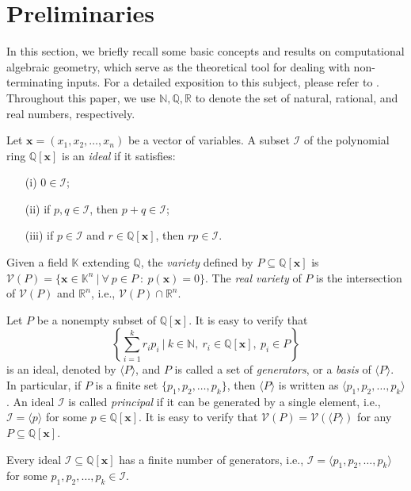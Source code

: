 \documentclass{jssc}
\newcommand{\I}{\mathcal{I}}
\newcommand{\V}{\mathcal{V}}
\newcommand{\xx}{\mathbf{x}}
\begin{document}
\section{Preliminaries}\label{sec:prel}
In this section, we briefly recall some basic concepts and results on computational algebraic geometry, which serve as the theoretical tool for dealing with non-terminating inputs. For a detailed exposition to this subject, please refer to \cite{cox:ideal}. Throughout this paper, we use $\mathbb{N}, \mathbb{Q}, \mathbb{R}$ to denote the set of natural, rational, and real numbers, respectively.

\begin{definition}[Ideal]
Let $\xx=(x_1,x_2,\ldots,x_n)$ be a vector of variables. A subset $\I$ of the polynomial ring $\mathbb{Q}[\xx]$ is an \emph{ideal} if it satisfies:
\begin{itemize}
\item[(i)] $0 \in \I$;
\item[(ii)] if $p,q \in \I$, then $p+q \in \I$;
\item[(iii)] if $p \in \I$ and $r \in \mathbb{Q}[\xx]$, then $rp \in \I$.
\end{itemize}
\end{definition}

\begin{definition}[Variety]
Given a field $\mathbb{K}$ extending $\mathbb{Q}$, the \emph{variety} defined by $P \subseteq \mathbb{Q}[\xx]$ is $\V(P)=\{\xx \in \mathbb{K}^n \ | \ \forall \ p \in P \ : \ p(\xx)=0 \}$. The \emph{real variety} of $P$ is the intersection of $\V(P)$ and $\mathbb{R}^n$, i.e., $\V(P) \cap \mathbb{R}^n$.
\end{definition}

Let $P$ be a nonempty subset of $\mathbb{Q}[\xx]$. It is easy to verify that
\[
\left\{\sum_{i=1}^k r_i p_i \ | \ k \in \mathbb{N}, \ r_i \in \mathbb{Q}[\xx],\ p_i \in P \right\}
\]
is an ideal, denoted by $\langle P\rangle$, and $P$ is called a set of \emph{generators}, or a \emph{basis} of $\langle P \rangle$. In particular, if $P$ is a finite set $\{p_1,p_2,\ldots,p_k\}$, then $\langle P \rangle$ is written as $\langle p_1,p_2,\ldots,p_k \rangle$. An ideal $\I$ is called \emph{principal} if it can be generated by a single element, i.e., $\I=\langle p \rangle$ for some $p\in \mathbb{Q}[\xx]$. It is easy to verify that $\V(P)=\V(\langle P \rangle)$ for any $P \subseteq \mathbb{Q}[\xx]$.

\begin{theorem}\label{basis}
Every ideal $\I \subseteq \mathbb{Q}[\xx]$ has a finite number of generators, i.e., $\I=\langle p_1,p_2,\ldots,p_k \rangle$ for some $p_1,p_2,\ldots,p_k \in \I$.
\end{theorem}
\end{document}
